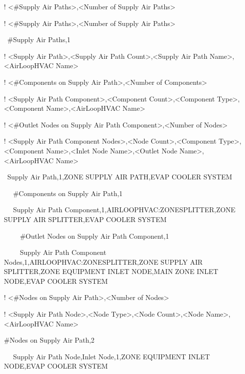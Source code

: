 ! \textless{}\#Supply Air Paths\textgreater{},\textless{}Number of Supply Air Paths\textgreater{}

! \textless{}\#Supply Air Paths\textgreater{},\textless{}Number of Supply Air Paths\textgreater{}

~\#Supply Air Paths,1

! \textless{}Supply Air Path\textgreater{},\textless{}Supply Air Path Count\textgreater{},\textless{}Supply Air Path Name\textgreater{},\textless{}AirLoopHVAC Name\textgreater{}

! \textless{}\#Components on Supply Air Path\textgreater{},\textless{}Number of Components\textgreater{}

! \textless{}Supply Air Path Component\textgreater{},\textless{}Component Count\textgreater{},\textless{}Component Type\textgreater{},\textless{}Component Name\textgreater{},\textless{}AirLoopHVAC Name\textgreater{}

! \textless{}\#Outlet Nodes on Supply Air Path Component\textgreater{},\textless{}Number of Nodes\textgreater{}

! \textless{}Supply Air Path Component Nodes\textgreater{},\textless{}Node Count\textgreater{},\textless{}Component Type\textgreater{},\textless{}Component Name\textgreater{},\textless{}Inlet Node Name\textgreater{},\textless{}Outlet Node Name\textgreater{},\textless{}AirLoopHVAC Name\textgreater{}

~Supply Air Path,1,ZONE SUPPLY AIR PATH,EVAP COOLER SYSTEM

~~ \#Components on Supply Air Path,1

~~ Supply Air Path Component,1,AIRLOOPHVAC:ZONESPLITTER,ZONE SUPPLY AIR SPLITTER,EVAP COOLER SYSTEM

~~~~ \#Outlet Nodes on Supply Air Path Component,1

~~~~ Supply Air Path Component Nodes,1,AIRLOOPHVAC:ZONESPLITTER,ZONE SUPPLY AIR SPLITTER,ZONE EQUIPMENT INLET NODE,MAIN ZONE INLET NODE,EVAP COOLER SYSTEM

! \textless{}\#Nodes on Supply Air Path\textgreater{},\textless{}Number of Nodes\textgreater{}

! \textless{}Supply Air Path Node\textgreater{},\textless{}Node Type\textgreater{},\textless{}Node Count\textgreater{},\textless{}Node Name\textgreater{},\textless{}AirLoopHVAC Name\textgreater{}

\#Nodes on Supply Air Path,2

~~ Supply Air Path Node,Inlet Node,1,ZONE EQUIPMENT INLET NODE,EVAP COOLER SYSTEM

